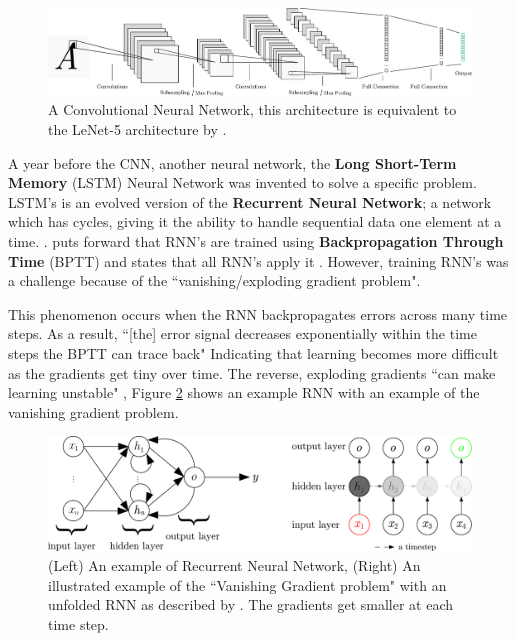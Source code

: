 \documentclass[report, 11pt, oneside]{dissertation}
\begin{document}
\begin{figure}[!htb]
	\centering
	\includegraphics[scale=0.45]{figure_5}
	\caption[Convolutional Neural Network.]{A Convolutional Neural Network, this architecture is equivalent to the LeNet-5 architecture by \citep{LeCun:98}.}
	\label{fig:convnet}
\end{figure}


A year before the CNN, another neural network, the \textbf{Long Short-Term Memory} (LSTM) Neural Network was invented to solve a specific problem. LSTM's is an evolved version of the \textbf{Recurrent Neural Network}; a network which has cycles, giving it the ability to handle sequential data one element at a time. \citep[2]{Lipton:2015tj}. \citeauthor{Lipton:2015tj} puts forward that RNN's are trained using \textbf{Backpropagation Through Time} (BPTT) and states that all RNN's apply it \citeyearpar[11]{Lipton:2015tj}. However, training RNN's was a challenge because of the ``vanishing/exploding gradient problem".

 This phenomenon occurs when the RNN backpropagates errors across many time steps. As a result, ``[the] error signal decreases exponentially within the time steps the BPTT can trace back" \citep[53]{wang:2017} Indicating that learning becomes more difficult as the gradients get tiny over time. The reverse, exploding gradients ``can make learning unstable" \citep[282]{Goodfellow-et-al-2016}, Figure \ref{fig:vgp} shows an example RNN with an example of the vanishing gradient problem.
 
 
 \begin{figure}[!htb]
	\centering
	\includegraphics[scale=0.65]{figure_6}
	\caption[Recurrent Neural Network \& Vanishing Gradient Problem.]{(Left) An example of Recurrent Neural Network, (Right) An illustrated example of the ``Vanishing Gradient problem" with an unfolded RNN as described by \citep{Lipton:2015tj}. The gradients get smaller at each time step.}
	\label{fig:vgp}
\end{figure}
\end{document}

